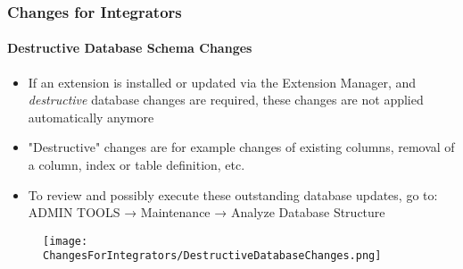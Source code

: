 
\begin{frame}[fragile]
	\frametitle{Changes for Integrators}
	\framesubtitle{Destructive Database Schema Changes}

	\begin{itemize}
		\item If an extension is installed or updated via the Extension Manager,
			and \textit{destructive} database changes are required, these changes
			are not applied automatically anymore
		\item "Destructive" changes are for example changes of existing columns,
			removal of a column, index or table definition, etc.
		\item To review and possibly execute these outstanding database updates,
			go to: ADMIN TOOLS → Maintenance → Analyze Database Structure\newline
	\end{itemize}

	\vspace{-0.4cm}


	\begin{figure}
		\texttt{[image: ChangesForIntegrators/DestructiveDatabaseChanges.png]}
	\end{figure}

\end{frame}


